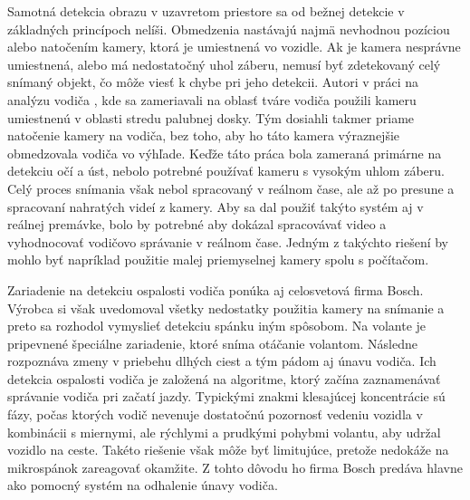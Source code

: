 \documentclass[slovak,master,dept460,male,cpp,cpdeclaration]{diploma}
\begin{document}
Samotná detekcia obrazu v uzavretom priestore sa od bežnej detekcie v základných princípoch nelíši. Obmedzenia nastávajú najmä nevhodnou pozíciou alebo natočením kamery, ktorá je umiestnená vo vozidle. Ak je kamera nesprávne umiestnená, alebo má nedostatočný uhol záberu, nemusí byť zdetekovaný celý snímaný objekt, čo môže viesť k chybe pri jeho detekcii. Autori v práci na analýzu vodiča \cite{smith2003determining}, kde sa zameriavali na oblasť tváre vodiča použili kameru umiestnenú v oblasti stredu palubnej dosky. Tým dosiahli takmer priame natočenie kamery na vodiča, bez toho, aby ho táto kamera výraznejšie obmedzovala vodiča vo výhľade. Keďže táto práca bola zameraná primárne na detekciu očí a úst, nebolo potrebné  používať kameru s vysokým uhlom záberu. Celý proces snímania však nebol spracovaný v reálnom čase, ale až po presune a spracovaní nahratých videí z kamery. Aby sa dal použiť takýto systém aj v reálnej premávke, bolo by potrebné aby dokázal spracovávať video  a vyhodnocovať vodičovo správanie v reálnom čase. Jedným z takýchto riešení by mohlo byť napríklad použitie malej priemyselnej kamery spolu s počítačom.\par
Zariadenie na detekciu ospalosti vodiča  ponúka aj celosvetová firma Bosch. Výrobca si však uvedomoval všetky nedostatky použitia kamery na snímanie a preto sa rozhodol vymyslieť detekciu  spánku iným spôsobom. Na volante je pripevnené špeciálne zariadenie, ktoré sníma otáčanie volantom. Následne rozpoznáva zmeny v priebehu dlhých ciest a tým pádom aj únavu vodiča. Ich detekcia ospalosti vodiča je založená na algoritme, ktorý začína zaznamenávať správanie vodiča pri začatí jazdy. Typickými znakmi klesajúcej koncentrácie sú fázy, počas ktorých vodič nevenuje dostatočnú pozornosť vedeniu vozidla v kombinácii s miernymi, ale rýchlymi a prudkými pohybmi volantu, aby udržal vozidlo na ceste. Takéto riešenie však môže byť limitujúce, pretože nedokáže na mikrospánok zareagovať okamžite. Z tohto dôvodu ho firma Bosch predáva hlavne ako pomocný systém na odhalenie únavy vodiča. \par
\end{document}
